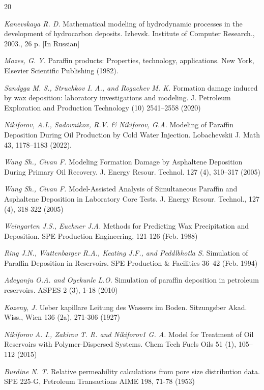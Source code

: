\documentclass[
11pt,%
tightenlines,%
twoside,%
onecolumn,%
nofloats,%
nobibnotes,%
nofootinbib,%
superscriptaddress,%
noshowpacs,%
centertags]%
{revtex4-2}
\begin{document}
\begin{thebibliography}{20}

\textit {Kanevskaya R. D.} Mathematical modeling of hydrodynamic processes in the development of hydrocarbon deposits. Izhevsk. Institute of Computer Research., 2003., 26 p. [In Russian]

\textit {Mozes, G. Y.} Paraffin products: Properties, technology, applications. New York, Elsevier Scientific Publishing (1982).

\textit {Sandyga M. S., Struchkov I. A., and Rogachev M. K.} Formation damage induced by wax deposition: laboratory investigations and modeling. J. Petroleum Exploration and Production Technology (10) 2541–2558 (2020) 

\textit {Nikiforov, A.I., Sadovnikov, R.V. \& Nikiforov, G.A.} Modeling of Paraffin Deposition During Oil Production by Cold Water Injection. Lobachevskii J. Math 43, 1178–1183 (2022).

\textit {Wang Sh., Civan F.} Modeling Formation Damage by Asphaltene Deposition During Primary Oil Recovery. J. Energy Resour. Technol. 127 (4), 310–317 (2005) 

\textit {Wang Sh., Civan F.} Model-Assisted Analysis of Simultaneous Paraffin and Asphaltene Deposition in Laboratory Core Tests. J. Energy Resour. Technol., 127 (4), 318-322 (2005) 

\textit {Weingarten J.S., Euchner J.A.} Methods for Predicting Wax Precipitation and Deposition. SPE Production Engineering, 121-126 (Feb. 1988) 

\textit {Ring J.N., Wattenbarger R.A., Keating J.F., and Peddlbhotla S.} Simulation of Paraffin Deposition in Reservoirs. SPE Production \& Facilities 36–42 (Feb. 1994) 

\textit {Adeyanju O.A. and Oyekunle L.O.} Simulation of paraffin deposition in petroleum reservoirs. ASPES 2 (3), 1-18 (2010) 

\textit {Kozeny, J.} Ueber kapillare Leitung des Wassers im Boden. Sitzungsber Akad. Wiss., Wien 136 (2a), 271-306 (1927)

\textit {Nikiforov A. I., Zakirov T. R. and Nikiforov1 G. A.} Model for Treatment of Oil Reservoirs with Polymer-Dispersed Systems. Chem Tech Fuels Oils 51 (1), 105–112 (2015) 

\textit {Burdine N. T.} Relative permeability calculations from pore size distribution data. SPE 225-G, Petroleum Transactions AIME 198, 71-78 (1953) 


\end{thebibliography}
\end{document}
